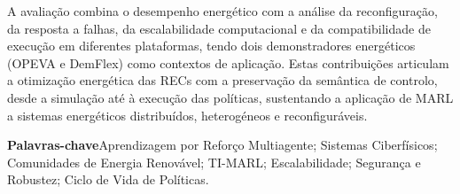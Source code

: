 A avaliação combina o desempenho energético com a análise da reconfiguração, da resposta a falhas, da escalabilidade computacional e da compatibilidade de execução em diferentes plataformas, tendo dois demonstradores energéticos (OPEVA e DemFlex) como contextos de aplicação. Estas contribuições articulam a otimização energética das RECs com a preservação da semântica de controlo, desde a simulação até à execução das políticas, sustentando a aplicação de MARL a sistemas energéticos distribuídos, heterogéneos e reconfiguráveis.

\vspace{3mm}
\noindent\textbf{Palavras-chave}\quad Aprendizagem por Reforço Multiagente; Sistemas Ciberfísicos; Comunidades de Energia Renovável; TI-MARL; Escalabilidade; Segurança e Robustez; Ciclo de Vida de Políticas.
